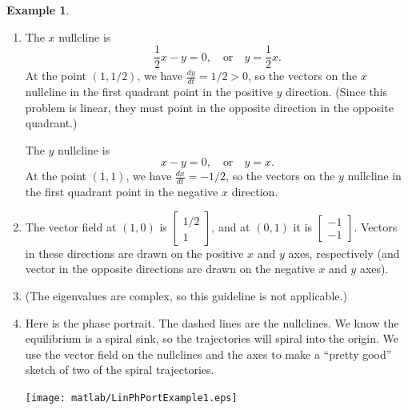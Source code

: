 \documentclass[reqno]{immbook}
\numberwithin{equation}{chapter}
\numberwithin{question}{section}
\numberwithin{theorem}{chapter}
\numberwithin{figure}{chapter}
\theoremstyle{definition}
\newtheorem{example}{Example}[section]
\begin{document}
\begin{example}
\begin{enumerate}
\begin{multline}
         \sin\left(\sqrt{7}t/4\right) \right\} \\
	 +
	  c_2 e^{-(1/4)t}
	 \left\{
	 \begin{bmatrix} 1 \\ \frac{3}{4} \end{bmatrix}
	   \sin\left( \sqrt{7}t/4 \right)
	  +
	 \begin{bmatrix} 0 \\ -\frac{\sqrt{7}}{4} \end{bmatrix}
	   \cos \left( \sqrt{7}t/4 \right)
	   \right\}
\end{multline}

\item
The $x$ nullcline is
\[
    \frac{1}{2} x - y = 0, \quad \textrm{or} \quad y = \frac{1}{2}x.
\]
At the point $(1,1/2)$, we have $\frac{dy}{dt} = 1/2 > 0$, so the
vectors on the $x$ nullcline in the first quadrant point in the
positive $y$ direction. (Since this problem is linear, they
must point in the opposite direction in the opposite quadrant.)

The $y$ nullcline is
\[
  x - y = 0, \quad \textrm{or} \quad y = x.
\]
At the point $(1,1)$, we have $\frac{dx}{dt} = -1/2$, so the
vectors on the $y$ nullcline in the first quadrant point
in the negative $x$ direction.
\item The vector field at $(1,0)$ is
$\begin{bmatrix} 1/2 \\ 1\end{bmatrix}$, and at $(0,1)$ it
is
$\begin{bmatrix} -1 \\ -1 \end{bmatrix}$.
Vectors in these directions are drawn on the positive
$x$ and $y$ axes, respectively (and vector in the opposite
directions are drawn on the negative $x$ and $y$ axes).
\item
(The eigenvalues are complex, so this guideline is not
applicable.)
\item
Here is the phase portrait.  The dashed lines are the nullclines.
We know the equilibrium is a spiral sink, so the trajectories
will spiral into the origin.  We use the vector field on the
nullclines and the axes to make a ``pretty good'' sketch
of two of the spiral trajectories.

\medskip
\noindent
\centerline{\texttt{[image: matlab/LinPhPortExample1.eps]}}
\end{enumerate}
\end{example}
\end{document}
